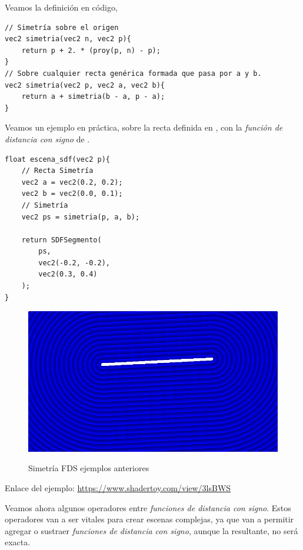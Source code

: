 \newpage
Veamos la definición en código,
\begin{lstlisting}
// Simetría sobre el origen
vec2 simetria(vec2 n, vec2 p){
    return p + 2. * (proy(p, n) - p);
}
// Sobre cualquier recta genérica formada que pasa por a y b.
vec2 simetria(vec2 p, vec2 a, vec2 b){
    return a + simetria(b - a, p - a);
}
\end{lstlisting}
Veamos un ejemplo en práctica, sobre la recta definida en , con la \textit{función de distancia con signo} de .
\begin{lstlisting}
float escena_sdf(vec2 p){
    // Recta Simetría
    vec2 a = vec2(0.2, 0.2);
    vec2 b = vec2(0.0, 0.1);
    // Simetría
    vec2 ps = simetria(p, a, b);
    
    return SDFSegmento(
        ps,
        vec2(-0.2, -0.2), 
        vec2(0.3, 0.4)
    );
}
\end{lstlisting}

\begin{figure}[H]
  \centering
  \captionsetup{justification=centering}%
  \includegraphics[width=1.0\textwidth]{secciones/imagenes/sdf/2d/sdf_simetria.png}\label{fig:simetria}
  \caption{Simetría FDS ejemplos anteriores}
\end{figure}

Enlace del ejemplo:
\url{https://www.shadertoy.com/view/3lsBWS}

Veamos ahora algunos operadores entre \textit{funciones de distancia con signo}. Estos operadores van a ser vitales para crear escenas complejas, ya que van a permitir agregar o sustraer \textit{funciones de distancia con signo}, aunque la resultante, no será exacta.

